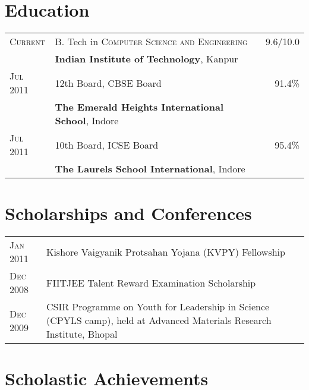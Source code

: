 \documentclass[a4paper,10pt]{article} %
\newcommand{\itemlist}[1]{
    \begin{tabular}{>{\raggedleft}p{2.2cm}p{17cm}}
        #1
    \end{tabular}
}
\begin{document}
\section{Education}

\begin{tabular}{>{\raggedleft}p{2.2cm}p{14cm}r}

    \textsc{Current} & B. Tech in \textsc{Computer Science and Engineering} &   9.6/10.0\\
                     & \textbf{Indian Institute of Technology}, Kanpur\\

    \textsc{Jul 2011} & 12th Board, \textsc{CBSE} Board                    &   91.4\% \\
                       & \normalsize\textbf{The Emerald Heights International School}, Indore\\

    \textsc{Jul 2011} & 10th Board, \textsc{ICSE} Board                    &   95.4\% \\
                       & \normalsize\textbf{The Laurels School International}, Indore \\

\end{tabular}

\section{Scholarships and Conferences}


\itemlist {
    \textsc{Jan 2011} & Kishore Vaigyanik Protsahan Yojana (KVPY) Fellowship \\
    \textsc{Dec 2008} & FIITJEE Talent Reward Examination Scholarship \\
    \textsc{Dec 2009} & CSIR Programme on Youth for Leadership in Science (CPYLS camp),
                        held at Advanced Materials Research Institute, Bhopal\\
}


\section{Scholastic Achievements}
\end{document}
